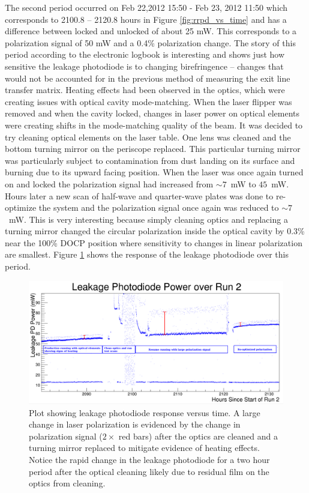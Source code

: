 The second period occurred on Feb 22,2012 15:50 - Feb 23, 2012 11:50 which corresponds to  2100.8 -- 2120.8 hours in Figure \ref{fig:rrpd_vs_time} and  has a difference between locked and unlocked of about 25 mW. This corresponds to a polarization signal of 50 mW and a 0.4\% polarization change. The story of this period according to the electronic logbook is interesting and shows just how sensitive the leakage photodiode is to changing birefringence -- changes that would not be accounted for in the previous method of measuring the exit line transfer matrix. Heating effects had been observed in the optics, which were creating issues with optical cavity mode-matching. When the laser flipper was removed and when the cavity locked, changes in laser power on optical elements were creating shifts in the mode-matching quality of the beam. It was decided to try cleaning optical elements on the laser table. One lens was cleaned and the bottom turning mirror on the periscope replaced. This particular turning mirror was particularly subject to contamination from dust landing on its surface and burning due to its upward facing position. When the laser was once again turned on and locked the polarization signal had increased from $\sim 7$~mW to $45$~mW. Hours later a new scan of half-wave and quarter-wave plates was done to re-optimize the system and the polarization signal once again was reduced to $\sim 7$~mW. This is very interesting because simply cleaning optics and replacing a turning mirror changed the circular polarization inside the optical cavity by 0.3\% near the 100\% DOCP position where sensitivity to changes in linear polarization are smallest. Figure \ref{fig:optics_cleaning} shows the response of the leakage photodiode over this period.

\begin{figure}[ht]
\begin{center}
\includegraphics[width=5.5in]{./Pictures/Optics_cleaning_pol_sig.png}
\caption{\label{fig:optics_cleaning}Plot showing leakage photodiode response versus time. A large change in laser polarization is evidenced by the change in polarization signal ($2\times$ red bars) after the optics are cleaned and a turning mirror replaced to mitigate evidence of heating effects. Notice the rapid change in the leakage photodiode for a two hour period after the optical cleaning likely due to residual film on the optics from cleaning.}
\end{center}
\end{figure} 

